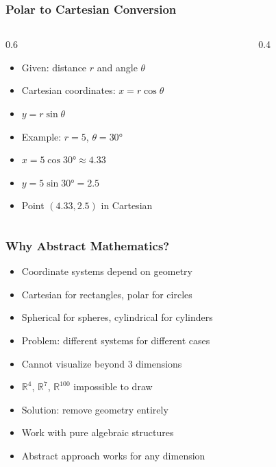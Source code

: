 \begin{frame}[fragile]\frametitle{Polar to Cartesian Conversion}
  \begin{columns}
    \begin{column}[T]{0.6\linewidth}
      \begin{itemize}
        \item Given: distance $r$ and angle $\theta$
        \item Cartesian coordinates: $x = r \cos \theta$
        \item $y = r \sin \theta$
        \item Example: $r=5$, $\theta=30°$
        \item $x = 5 \cos 30° \approx 4.33$
        \item $y = 5 \sin 30° = 2.5$
        \item Point $(4.33, 2.5)$ in Cartesian
      \end{itemize}
    \end{column}
    \begin{column}[T]{0.4\linewidth}
      \begin{center}
      \end{center}
    \end{column}
  \end{columns}
\end{frame}

\begin{frame}[fragile]\frametitle{Why Abstract Mathematics?}
  \begin{itemize}
    \item Coordinate systems depend on geometry
    \item Cartesian for rectangles, polar for circles
    \item Spherical for spheres, cylindrical for cylinders
    \item Problem: different systems for different cases
    \item Cannot visualize beyond 3 dimensions
    \item $\mathbb{R}^4$, $\mathbb{R}^7$, $\mathbb{R}^{100}$ impossible to draw
    \item Solution: remove geometry entirely
    \item Work with pure algebraic structures
    \item Abstract approach works for any dimension
  \end{itemize}
\end{frame}

